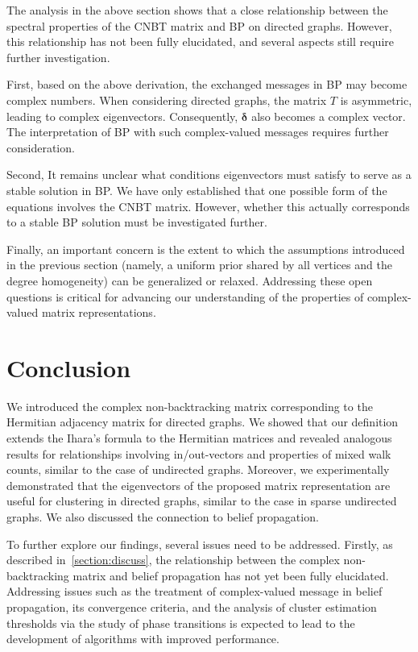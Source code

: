 \documentclass{article}
\theoremstyle{plain}
\begin{document}
The analysis in the above section shows that a close relationship between the spectral properties of the CNBT matrix and BP on directed graphs.
However, this relationship has not been fully elucidated, and several aspects still require further investigation.

First, based on the above derivation, the exchanged messages in BP may become complex numbers. When considering directed graphs, the matrix $T$ is asymmetric, leading to complex eigenvectors. Consequently, $\bm{\delta}$ also becomes a complex vector. The interpretation of BP with such complex-valued messages requires further consideration.

Second, It remains unclear what conditions eigenvectors must satisfy to serve as a stable solution in BP.
We have only established that one possible form of the equations involves the CNBT matrix.
However, whether this actually corresponds to a stable BP solution must be investigated further.

Finally, an important concern is the extent to which the assumptions introduced in the previous section (namely, a uniform prior shared by all vertices and the degree homogeneity) can be generalized or relaxed.
Addressing these open questions is critical for advancing our understanding of the properties of complex-valued matrix representations.

\section{Conclusion}\label{section:conclusion}

We introduced the complex non-backtracking matrix corresponding to the Hermitian adjacency matrix for directed graphs.
We showed that our definition extends the Ihara's formula to the Hermitian matrices
and revealed analogous results for relationships involving in/out-vectors and properties of mixed walk counts, similar to the case of undirected graphs.
Moreover, we experimentally demonstrated that the eigenvectors of the proposed matrix representation are useful for clustering in directed graphs, similar to the case in sparse undirected graphs. We also discussed the connection to belief propagation.

To further explore our findings, several issues need to be addressed.
Firstly, as described in~\ref{section:discuss},
the relationship between the complex non-backtracking matrix and belief propagation has not yet been fully elucidated.
Addressing issues such as the treatment of complex-valued message in belief propagation,
its convergence criteria, and the analysis of cluster estimation thresholds via the study of phase transitions is expected to lead to the development of algorithms with improved performance.
\end{document}
